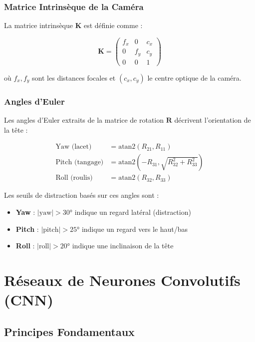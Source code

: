 \documentclass[12pt,a4paper,twoside]{report}
\begin{document}
\subsubsection{Matrice Intrinsèque de la Caméra}

La matrice intrinsèque $\mathbf{K}$ est définie comme :

\begin{equation}
\mathbf{K} = \begin{pmatrix} f_x & 0 & c_x \\ 0 & f_y & c_y \\ 0 & 0 & 1 \end{pmatrix}
\label{eq:camera_matrix}
\end{equation}

où $f_x, f_y$ sont les distances focales et $(c_x, c_y)$ le centre optique de la caméra.

\subsubsection{Angles d'Euler}

Les angles d'Euler extraits de la matrice de rotation $\mathbf{R}$ décrivent l'orientation de la tête :

\begin{align}
\text{Yaw (lacet)} &= \text{atan2}(R_{21}, R_{11}) \label{eq:yaw} \\
\text{Pitch (tangage)} &= \text{atan2}(-R_{31}, \sqrt{R_{32}^2 + R_{33}^2}) \label{eq:pitch} \\
\text{Roll (roulis)} &= \text{atan2}(R_{32}, R_{33}) \label{eq:roll}
\end{align}

Les seuils de distraction basés sur ces angles sont :
\begin{itemize}
    \item \textbf{Yaw} : $|\text{yaw}| > 30°$ indique un regard latéral (distraction)
    \item \textbf{Pitch} : $|\text{pitch}| > 25°$ indique un regard vers le haut/bas
    \item \textbf{Roll} : $|\text{roll}| > 20°$ indique une inclinaison de la tête
\end{itemize}

\section{Réseaux de Neurones Convolutifs (CNN)}

\subsection{Principes Fondamentaux}
\end{document}
